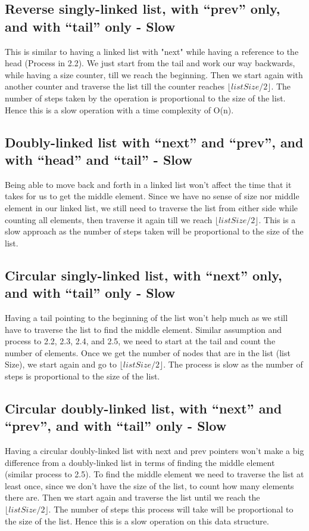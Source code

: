 \documentclass{article}
\begin{document}
\subsection{Reverse singly-linked list, with “prev” only, and with “tail” only - Slow}
This is similar to having a linked list with "next" while having a reference to the head (Process in 2.2). We just start from the tail and work our way backwards, while having a size counter, till we reach the beginning. Then we start again with another counter and traverse the list till the counter reaches $\lfloor {listSize/2} \rfloor$. The number of steps taken by the operation is proportional to the size of the list. Hence this is a slow operation with a time complexity of O(n).

\subsection{Doubly-linked list with “next” and “prev”, and with “head” and “tail” - Slow}
Being able to move back and forth in a linked list won't affect the time that it takes for us to get the middle element. Since we have no sense of size nor middle element in our linked list, we still need to traverse the list from either side while counting all elements, then traverse it again till we reach $\lfloor {listSize/2} \rfloor$. This is a slow approach as the number of steps taken will be proportional to the size of the list.

\subsection{Circular singly-linked list, with “next” only, and with “tail” only - Slow}
Having a tail pointing to the beginning of the list won't help much as we still have to traverse the list to find the middle element. Similar assumption and process to 2.2, 2.3, 2.4, and 2.5, we need to start at the tail and count the number of elements. Once we get the number of nodes that are in the list (list Size), we start again and go to $\lfloor {listSize/2} \rfloor$. The process is slow as the number of steps is proportional to the size of the list. 

\subsection{Circular doubly-linked list, with “next” and “prev”, and with “tail” only - Slow}
Having a circular doubly-linked list with next and prev pointers won't make a big difference from a doubly-linked list in terms of finding the middle element (similar process to 2.5). To find the middle element we need to traverse the list at least once, since we don't have the size of the list, to count how many elements there are. Then we start again and traverse the list until we reach the $\lfloor {listSize/2} \rfloor$. The number of steps this process will take will be proportional to the size of the list. Hence this is a slow operation on this data structure.
\end{document}
